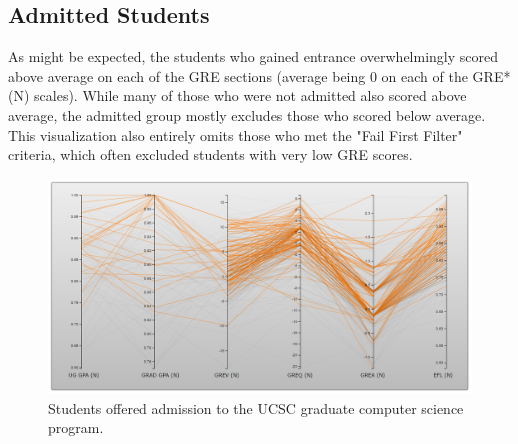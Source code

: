\documentclass[]{article}
\begin{document}
	\subsection {Admitted Students}
		As might be expected, the students who gained entrance overwhelmingly scored above average on each of the GRE sections (average being 0 on each of the GRE* (N) scales). While many of those who were not admitted also scored above average, the admitted group mostly excludes those who scored below average. This visualization also entirely omits those who met the "Fail First Filter" criteria, which often excluded students with very low GRE scores.
	
		\begin{figure}[h]
			\includegraphics[width=\linewidth]{admitted.png}
			\caption{Students offered admission to the UCSC graduate computer science program.}
			\label{fig:Admitted}
		\end{figure}
		
\end{document}
